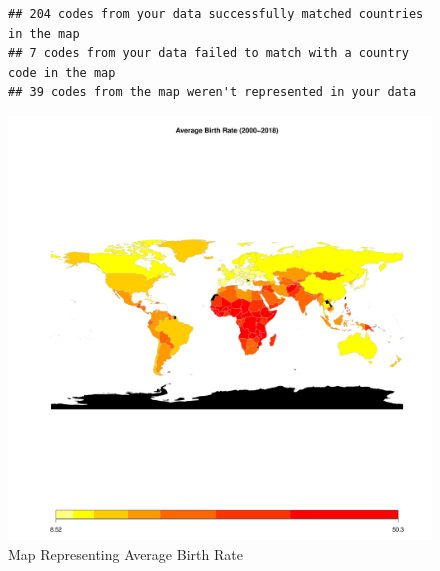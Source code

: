 \documentclass{article}\usepackage[]{graphicx}\usepackage[]{xcolor}
\makeatletter
\def\maxwidth{ %
  \ifdim\Gin@nat@width>\linewidth
    \linewidth
  \else
    \Gin@nat@width
  \fi
}
\newenvironment{kframe}{%
 \def\at@end@of@kframe{}%
 \ifinner\ifhmode%
  \def\at@end@of@kframe{\end{minipage}}%
  \begin{minipage}{\columnwidth}%
 \fi\fi%
 \def\FrameCommand##1{\hskip\@totalleftmargin \hskip-\fboxsep
 \colorbox{shadecolor}{##1}\hskip-\fboxsep
     \hskip-\linewidth \hskip-\@totalleftmargin \hskip\columnwidth}%
 \MakeFramed {\advance\hsize-\width
   \@totalleftmargin\z@ \linewidth\hsize
   \@setminipage}}%
 {\par\unskip\endMakeFramed%
 \at@end@of@kframe}
\newenvironment{knitrout}{}{} %
\makeatother
\begin{document}
\begin{figure}[h!]
\centering
\begin{knitrout}
\color{fgcolor}\begin{kframe}
\begin{verbatim}
## 204 codes from your data successfully matched countries in the map
## 7 codes from your data failed to match with a country code in the map
## 39 codes from the map weren't represented in your data
\end{verbatim}
\end{kframe}
\includegraphics[width=\maxwidth]{figure/unnamed-chunk-16-1} 
\end{knitrout}
\caption{Map Representing Average Birth Rate}

\label{fig}
\end{figure}


\newpage
\end{document}
